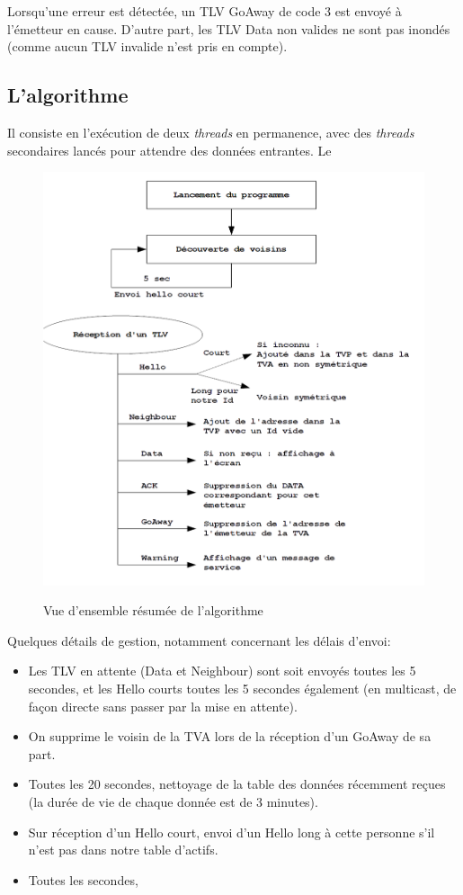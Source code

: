 \documentclass[11pt,a4paper]{article}
\begin{document}
Lorsqu'une erreur est détectée, un TLV GoAway de code 3 est envoyé à l'émetteur en cause. D'autre part, les TLV Data non valides ne sont pas inondés (comme aucun TLV invalide 
n'est pris en compte).

\subsection{L'algorithme}
	
	Il consiste en l'exécution de deux \emph{threads} en permanence, avec des \emph{threads} secondaires lancés pour attendre des données entrantes.
	Le 
	
	\begin{figure}[ht!]
		\centering
			\includegraphics[width=.8\columnwidth]{img.png}
		\label{fig:img}
		\caption{Vue d'ensemble résumée de l'algorithme}
	\end{figure}
	
	Quelques détails de gestion, notamment concernant les délais d'envoi:
	
	\begin{itemize}
		\item 	Les TLV en attente (Data et Neighbour) sont soit envoyés toutes les 5 secondes, et les Hello courts toutes les 5 secondes également (en multicast, de façon 	directe sans passer par la mise en attente).
	
	\item On supprime le voisin de la TVA lors de la réception d'un GoAway de sa part.
	
	\item Toutes les 20 secondes, nettoyage de la table des données récemment reçues (la durée de vie de chaque donnée est de 3 minutes).
	
	\item Sur réception d'un Hello court, envoi d'un Hello long à cette personne s'il n'est pas dans notre table d'actifs.
	
	\item  Toutes les secondes, 

	\end{itemize}
	
\end{document}
